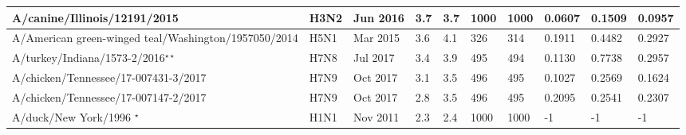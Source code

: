 \begin{tabular}{L{1.9in}|L{.35in}|L{.35in}|L{.35in}|L{.35in}|L{.35in}|L{.35in}|L{.35in}|L{.35in}|L{.35in}}
 A/canine/Illinois/12191/2015 &H3N2& Jun  2016 &3.7&3.7&1000&1000&0.0607&0.1509&0.0957\\\hline
 A/American  green-winged  teal/Washington/1957050/2014 &H5N1& Mar 2015 &3.6&4.1&326&314&0.1911&0.4482&0.2927\\\hline
 A/turkey/Indiana/1573-2/2016$^{\star\star}$ &H7N8& Jul  2017 &3.4&3.9&495&494&0.1130&0.7738&0.2957\\\hline
 A/chicken/Tennessee/17-007431-3/2017 &H7N9& Oct  2017 &3.1&3.5&496&495&0.1027&0.2569&0.1624\\\hline
 A/chicken/Tennessee/17-007147-2/2017 &H7N9& Oct  2017 &2.8&3.5&496&495&0.2095&0.2541&0.2307\\\hline
 A/duck/New  York/1996 $^\star$&H1N1& Nov  2011 &2.3&2.4&1000&1000&-1&-1&-1\\\hline
 \end{tabular}
